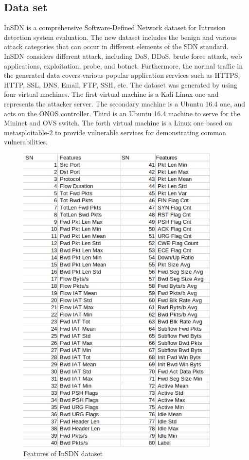\subsection{Data set}
\vspace{-18pt}
InSDN is a comprehensive Software-Defined Network dataset for Intrusion detection system evaluation. The new dataset includes the benign and various attack categories  that can occur in different elements of the SDN standard. InSDN considers different attack, including DoS, DDoS, brute force attack, web applications, exploitation, probe, and botnet. Furthermore, the normal traffic in the generated data covers  various  popular  application services such as HTTPS, HTTP, SSL, DNS, Email, FTP, SSH, etc. The dataset was generated by using four virtual machines. The first virtual machine is a Kali Linux one and represents the attacker server. The secondary machine is a Ubuntu 16.4 one, and acts on the ONOS controller. Third is an Ubuntu 16.4 machine to serve for the Mininet and OVS switch. The forth virtual machine is a Linux one based on metasploitable-2 to provide vulnerable services for demonstrating common vulnerabilities\cite{article}.
\begin{figure}[h] %
\begin{center}
	\includegraphics[width=4in]{images/ds2.png} 
	\caption{Features of InSDN dataset} %
	\label{} %
\end{center}
\end{figure}
